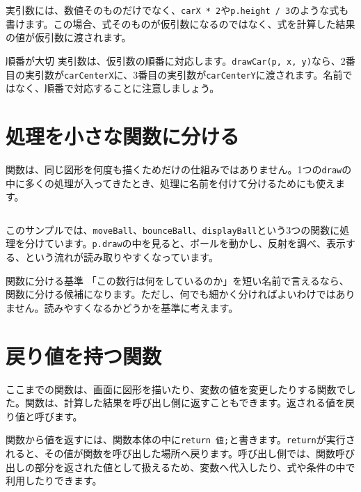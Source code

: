 実引数には、数値そのものだけでなく、\texttt{carX * 2}や\texttt{p.height / 3}のような式も書けます。この場合、式そのものが仮引数になるのではなく、式を計算した結果の値が仮引数に渡されます。

\begin{notebox}{順番が大切}
実引数は、仮引数の順番に対応します。\texttt{drawCar(p, x, y)}なら、2番目の実引数が\texttt{carCenterX}に、3番目の実引数が\texttt{carCenterY}に渡されます。名前ではなく、順番で対応することに注意しましょう。
\end{notebox}

\section{処理を小さな関数に分ける}

関数は、同じ図形を何度も描くためだけの仕組みではありません。1つの\texttt{draw}の中に多くの処理が入ってきたとき、処理に名前を付けて分けるためにも使えます。

\begin{listing}[htbp]
\inputminted{ts}{typescript-p5/listings/chapter08/bouncing-ball-functions.ts}
\caption{移動、反射、表示を関数に分ける（\texttt{chapter08/bouncing-ball-functions.ts}）}
\label{lst:chapter08-bouncing-ball-functions}
\end{listing}

このサンプルでは、\texttt{moveBall}、\texttt{bounceBall}、\texttt{displayBall}という3つの関数に処理を分けています。\texttt{p.draw}の中を見ると、ボールを動かし、反射を調べ、表示する、という流れが読み取りやすくなっています。

\begin{pointbox}{関数に分ける基準}
「この数行は何をしているのか」を短い名前で言えるなら、関数に分ける候補になります。ただし、何でも細かく分ければよいわけではありません。読みやすくなるかどうかを基準に考えます。
\end{pointbox}

\section{戻り値を持つ関数}

ここまでの関数は、画面に図形を描いたり、変数の値を変更したりする関数でした。関数は、計算した結果を呼び出し側に返すこともできます。返される値を戻り値と呼びます。

関数から値を返すには、関数本体の中に\texttt{return 値;}と書きます。\texttt{return}が実行されると、その値が関数を呼び出した場所へ戻ります。呼び出し側では、関数呼び出しの部分を返された値として扱えるため、変数へ代入したり、式や条件の中で利用したりできます。

